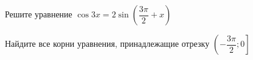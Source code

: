\begin{ex}
	\begin{condition}
		\begin{enumcols}[label=\asbuk*)]
			\item Решите уравнение \( \cos 3 x = 2 \sin {\left(\dfrac{3\pi }{2}+ x\right)} \)
			\item Найдите все корни уравнения, принадлежащие отрезку \( \left(-\dfrac{3\pi}{2};0\right] \)
		\end{enumcols}
	\end{condition}
\end{ex}